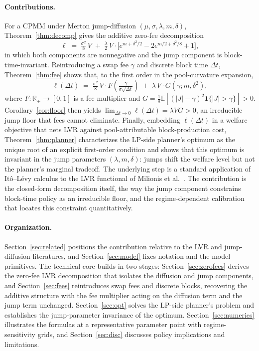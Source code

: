 \documentclass[runningheads]{llncs}
\newcommand{\E}{\mathbb{E}}
\newcommand{\R}{\mathbb{R}}
\newcommand{\dt}{\Delta t}
\newcommand{\1}{\mathbf{1}}
\begin{document}
\paragraph{Contributions.} For a CPMM under Merton jump-diffusion $(\mu,\sigma,\lambda,m,\delta)$, Theorem~\ref{thm:decomp} gives the additive zero-fee decomposition
\begin{equation}\label{eq:headline}
\ell \;=\; \tfrac{\sigma^2}{8}\,V \;+\; \tfrac{\lambda}{2}\,V \cdot \Big[e^{m+\delta^2/2} - 2 e^{m/2 + \delta^2/8} + 1\Big],
\end{equation}
in which both components are nonnegative and the jump component is block-time-invariant. Reintroducing a swap fee $\gamma$ and discrete block time $\dt$, Theorem~\ref{thm:fee} shows that, to the first order in the pool-curvature expansion,
\begin{equation}\label{eq:headline-fee}
\ell(\dt) \;=\; \tfrac{\sigma^2}{8}\,V \cdot F\!\left(\tfrac{\gamma}{\sigma\sqrt{\dt}}\right) \;+\; \lambda\,V \cdot G(\gamma; m, \delta^2),
\end{equation}
where $F:\R_+\to[0,1]$ is a fee multiplier and $G = \tfrac{1}{8}\E[(|J|-\gamma)^2\1\{|J|>\gamma\}] > 0$. Corollary~\ref{cor:floor} then yields $\lim_{\dt\to 0}\ell(\dt) = \lambda V G > 0$, an irreducible jump floor that fees cannot eliminate. Finally, embedding $\ell(\dt)$ in a welfare objective that nets LVR against pool-attributable block-production cost, Theorem~\ref{thm:planner} characterizes the LP-side planner's optimum as the unique root of an explicit first-order condition and shows that this optimum is invariant in the jump parameters $(\lambda,m,\delta)$: jumps shift the welfare level but not the planner's marginal tradeoff. The underlying step is a standard application of It\^o--L\'evy calculus to the LVR functional of Milionis et al.~\cite{milionis2022automated,milionis2023automated}. The contribution is the closed-form decomposition itself, the way the jump component constrains block-time policy as an irreducible floor, and the regime-dependent calibration that locates this constraint quantitatively.

\paragraph{Organization.} Section~\ref{sec:related} positions the contribution relative to the LVR and jump-diffusion literatures, and Section~\ref{sec:model} fixes notation and the model primitives. The technical core builds in two stages: Section~\ref{sec:zerofees} derives the zero-fee LVR decomposition that isolates the diffusion and jump components, and Section~\ref{sec:fees} reintroduces swap fees and discrete blocks, recovering the additive structure with the fee multiplier acting on the diffusion term and the jump term unchanged. Section~\ref{sec:opt} solves the LP-side planner's problem and establishes the jump-parameter invariance of the optimum. Section~\ref{sec:numerics} illustrates the formulas at a representative parameter point with regime-sensitivity grids, and Section~\ref{sec:disc} discusses policy implications and limitations.
\end{document}
